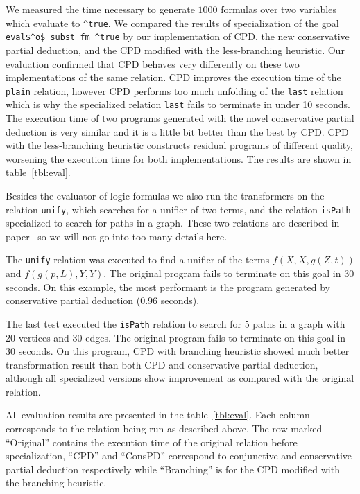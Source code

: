 We measured the time necessary to generate $1000$ formulas over two variables which evaluate to \lstinline{^true}.
We compared the results of specialization of the goal \lstinline{eval$^o$ subst fm ^true} by our implementation of CPD, the new conservative partial deduction, and the CPD modified with the less-branching heuristic.
Our evaluation confirmed that CPD behaves very differently on these two implementations of the same relation.
CPD improves the execution time of the \lstinline{plain} relation, however CPD performs too much unfolding of the  \lstinline{last} relation which is why the specialized relation \lstinline{last} fails to terminate in under 10 seconds.
The execution time of two programs generated with the novel conservative partial deduction is very similar and it is a little bit better than the best by CPD.
CPD with the less-branching heuristic constructs residual programs of different quality, worsening the execution time for both implementations.
The results are shown in table~\ref{tbl:eval}.

Besides the evaluator of logic formulas we also run the transformers on the relation \lstinline{unify}, which searches for a unifier of two terms, and the relation \lstinline{isPath} specialized to search for paths in a graph.
These two relations are described in paper~\cite{lozov2019relational} so we will not go into too many details here.

The \lstinline{unify} relation was executed to find a unifier of the terms $f(X, X, g(Z, t))$ and $f(g(p, L), Y, Y)$.
The original \mk{} program fails to terminate on this goal in 30 seconds.
On this example, the most performant is the program generated by conservative partial deduction (0.96 seconds).

The last test executed the \lstinline{isPath} relation to search for 5 paths in a graph with 20 vertices and 30 edges.
The original \mk{} program fails to terminate on this goal in 30 seconds.
On this program, CPD with branching heuristic showed much better transformation result than both CPD and conservative partial deduction, although all specialized versions show improvement as compared with the original relation.

All evaluation results are presented in the table~\ref{tbl:eval}.
Each column corresponds to the relation being run as described above.
The row marked ``Original'' contains the execution time of the original \mk{} relation before specialization, ``CPD'' and ``ConsPD'' correspond to conjunctive and conservative partial deduction respectively while ``Branching'' is for the CPD modified with the branching heuristic.

